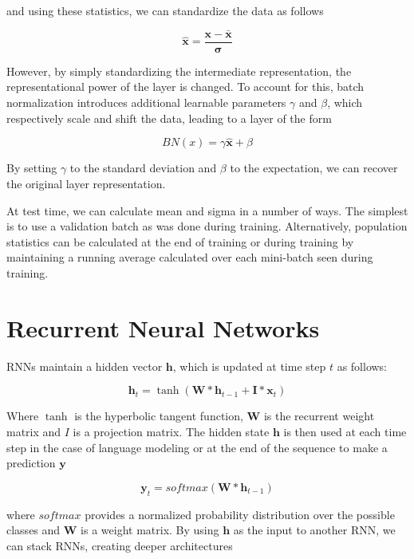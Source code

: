\documentclass{article}
\def\x{{\mathbf x}}
\begin{document}
and using these statistics, we can standardize the data as follows

\begin{equation}
	\hat \x = \frac{\x - \bar \x}{\boldsymbol \sigma}
\end{equation}

However, by simply standardizing the intermediate representation, the representational power of the layer is changed. To account for this, batch normalization introduces additional learnable parameters $\gamma$ and $\beta$, which respectively scale and shift the data, leading to a layer of the form

\begin{equation}
	BN(x) = \gamma \hat \x + \beta
\end{equation}

By setting $\gamma$ to the standard deviation and $\beta$ to the expectation, we can recover the original layer representation.

At test time, we can calculate mean and sigma in a number of ways. The simplest is to use a validation batch as was done during training. Alternatively, population statistics can be calculated at the end of training or during training by maintaining a running average calculated over each mini-batch seen during training.

\section{Recurrent Neural Networks}
RNNs maintain a hidden vector $\boldsymbol h$, which is updated at time step $t$ as follows:
 
\begin{equation}
	\boldsymbol h_t = \tanh(\boldsymbol W * \boldsymbol h_{t-1} + \boldsymbol I * \x_t) \nonumber
\end{equation}

Where $\tanh$ is the hyperbolic tangent function, $\boldsymbol W$ is the recurrent weight matrix and $I$ is a projection matrix. The hidden state $\boldsymbol h$ is then used at each time step in the case of language modeling or at the end of the sequence to make a prediction $\boldsymbol y$

\begin{equation}
	\boldsymbol y_t = softmax(\boldsymbol W * \boldsymbol h_{t-1}) \nonumber
\end{equation}

where $softmax$ provides a normalized probability distribution over the possible classes and $\boldsymbol W$ is a weight matrix. By using $\boldsymbol h$ as the input to another RNN, we can stack RNNs, creating deeper architectures \cite{pascanu2013construct}
\end{document}
